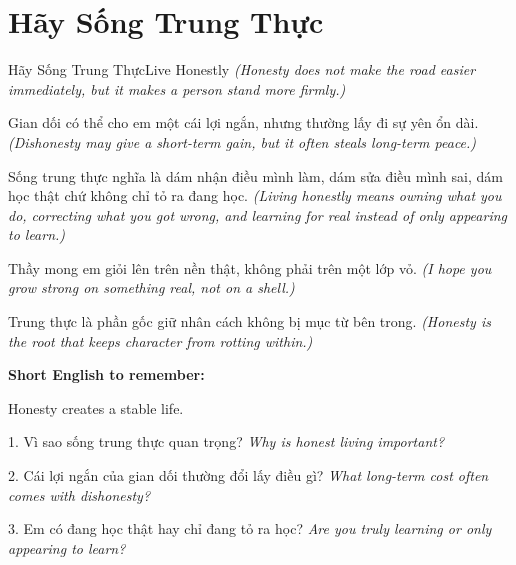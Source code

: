 \section{Hãy Sống Trung Thực}
\begin{truyen}{Hãy Sống Trung Thực}{Live Honestly}
\textit{(Honesty does not make the road easier immediately, but it makes a person stand more firmly.)}

Gian dối có thể cho em một cái lợi ngắn, nhưng thường lấy đi sự yên ổn dài.
\textit{(Dishonesty may give a short-term gain, but it often steals long-term peace.)}

Sống trung thực nghĩa là dám nhận điều mình làm, dám sửa điều mình sai, dám học thật chứ không chỉ tỏ ra đang học.
\textit{(Living honestly means owning what you do, correcting what you got wrong, and learning for real instead of only appearing to learn.)}

Thầy mong em giỏi lên trên nền thật, không phải trên một lớp vỏ.
\textit{(I hope you grow strong on something real, not on a shell.)}
\end{truyen}

\begin{baihoc}
Trung thực là phần gốc giữ nhân cách không bị mục từ bên trong.
\textit{(Honesty is the root that keeps character from rotting within.)}
\end{baihoc}

\begin{ghinhoanh}
\textbf{Short English to remember:}

Honesty creates a stable life.

\end{ghinhoanh}

\begin{tuhocnhanh}
1. Vì sao sống trung thực quan trọng? \textit{Why is honest living important?}

2. Cái lợi ngắn của gian dối thường đổi lấy điều gì? \textit{What long-term cost often comes with dishonesty?}

3. Em có đang học thật hay chỉ đang tỏ ra học? \textit{Are you truly learning or only appearing to learn?}
\end{tuhocnhanh}
\ngancach

